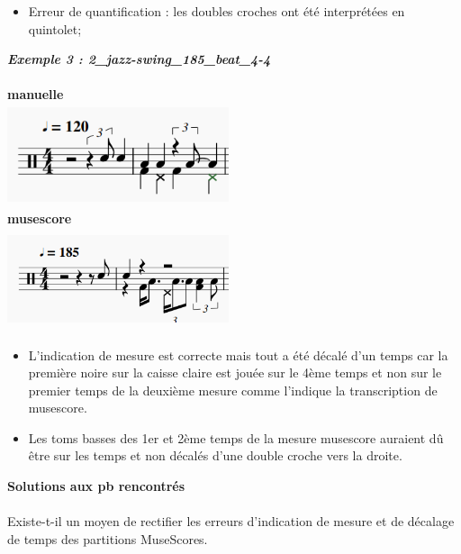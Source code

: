 \begin{itemize}
	\item Erreur de quantification : les doubles croches ont été interprétées en quintolet;\\
\end{itemize}
\textbf{\textit{Exemple 3 : 2\_jazz-swing\_185\_beat\_4-4}}
\\\\
\textbf{manuelle}\\
\includegraphics[height=30mm, width=65mm]{images/transcriptions_manuelles/0_prise_en_main/0_tests_drummer_01__session3/manuel_2.png} \\
\textbf{musescore}\\
\includegraphics[height=30mm, width=65mm]{images/transcriptions_manuelles/0_prise_en_main/0_tests_drummer_01__session3/musescore_2.png} \\
\begin{itemize}
	\item L’indication de mesure est correcte mais tout a été décalé d’un temps car la première noire sur la caisse claire est jouée sur le 4ème temps et non sur le premier temps de la deuxième mesure comme l’indique la transcription de musescore.
	\item Les toms basses des 1er et 2ème temps de la mesure musescore auraient dû être sur les temps et non décalés d’une double croche vers la droite.\\
\end{itemize}
\textbf{Solutions aux pb rencontrés}\\\\
Existe-t-il un moyen de rectifier les erreurs d’indication de mesure et de décalage de temps des partitions MuseScores.\\

